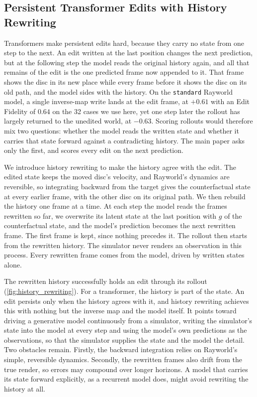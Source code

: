 \documentclass{article} %
\begin{document}
\FloatBarrier
\subsection{Persistent Transformer Edits with History Rewriting}
\label{app:history_editing}

Transformers make persistent edits hard, because they carry no state from one step to the next. An edit written at the last position changes the next prediction, but at the following step the model reads the original history again, and all that remains of the edit is the one predicted frame now appended to it. That frame shows the disc in its new place while every frame before it shows the disc on its old path, and the model sides with the history. On the \texttt{standard} Rayworld model, a single inverse-map write lands at the edit frame, at $+0.61$ with an Edit Fidelity of $0.64$ on the 32 cases we use here, yet one step later the rollout has largely returned to the unedited world, at $-0.63$. Scoring rollouts would therefore mix two questions: whether the model reads the written state and whether it carries that state forward against a contradicting history. The main paper asks only the first, and scores every edit on the next prediction.

We introduce history rewriting to make the history agree with the edit. The edited state keeps the moved disc's velocity, and Rayworld's dynamics are reversible, so integrating backward from the target gives the counterfactual state at every earlier frame, with the other disc on its original path. We then rebuild the history one frame at a time. At each step the model reads the frames rewritten so far, we overwrite its latent state at the last position with $g$ of the counterfactual state, and the model's prediction becomes the next rewritten frame. The first frame is kept, since nothing precedes it. The rollout then starts from the rewritten history. The simulator never renders an observation in this process. Every rewritten frame comes from the model, driven by written states alone. 

The rewritten history successfully holds an edit through its rollout (\cref{fig:history_rewriting}). For a transformer, the history is part of the state. An edit persists only when the history agrees with it, and history rewriting achieves this with nothing but the inverse map and the model itself. It points toward driving a generative model continuously from a simulator, writing the simulator's state into the model at every step and using the model's own predictions as the observations, so that the simulator supplies the state and the model the detail. Two obstacles remain. Firstly, the backward integration relies on Rayworld's simple, reversible dynamics. Secondly, the rewritten frames also drift from the true render, so errors may compound over longer horizons. A model that carries its state forward explicitly, as a recurrent model does, might avoid rewriting the history at all.
\end{document}
